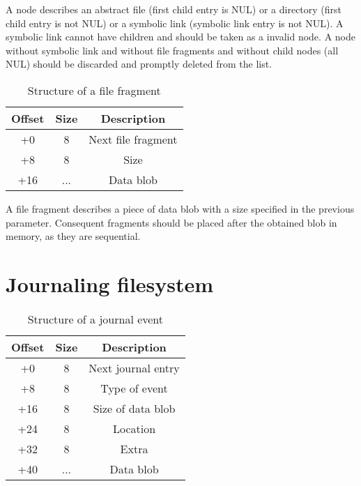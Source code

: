 \documentclass[12pt]{article}
\begin{document}
A node describes an abstract file (first child entry is NUL) or a directory (first child entry is not NUL) or a symbolic link (symbolic link entry is not NUL). A symbolic link cannot have children and should be taken as a invalid node. A node without symbolic link and without file fragments and without child nodes (all NUL) should be discarded and promptly deleted from the list.

\begin{table}
\centering
\begin{tabular}{ |c|c|c| }
\hline
Offset & Size & Description \\
\hline
+0 & 8 & Next file fragment \\
+8 & 8 & Size \\
+16 & ... & Data blob \\
\hline
\end{tabular}
\caption{Structure of a file fragment}
\end{table}

A file fragment describes a piece of data blob with a size specified in the previous parameter. Consequent fragments should be placed after the obtained blob in memory, as they are sequential.

\section{Journaling filesystem}

\begin{table}
\centering
\begin{tabular}{ |c|c|c| }
\hline
Offset & Size & Description \\
\hline
+0 & 8 & Next journal entry \\
+8 & 8 & Type of event \\
+16 & 8 & Size of data blob \\
+24 & 8 & Location \\
+32 & 8 & Extra \\
+40 & ... & Data blob \\
\hline
\end{tabular}
\caption{Structure of a journal event}
\end{table}
\end{document}
